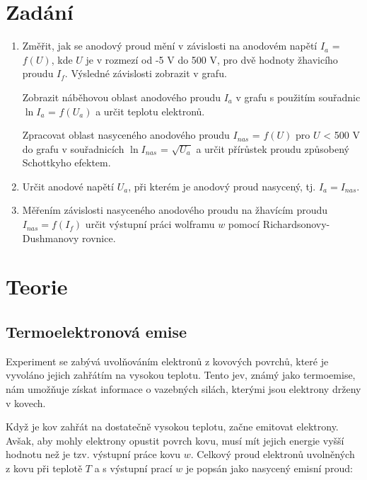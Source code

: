 \documentclass[a4paper,11pt]{article}
\begin{document}
\vskip10pt
    \begin{minipage}[t]{0.5\textwidth} 
        \section{Zadání}    
            \begin{enumerate}
                \item Změřit, jak se anodový proud mění v závislosti na anodovém napětí $I_a$ = $f(U)$, kde $U$ je v rozmezí od -5 V do 500 V, pro dvě hodnoty žhavicího proudu $I_f$. Výsledné závislosti zobrazit v grafu.
                \par Zobrazit náběhovou oblast anodového proudu $I_a$ v grafu s použitím souřadnic $\ln I_a$ = $f(U_a)$ a určit teplotu elektronů.
                \par Zpracovat oblast nasyceného anodového proudu $I_{nas}$ = $f(U)$ pro $U$ < 500 V do grafu v souřadnicích $\ln I_{nas}$ = $\sqrt{U_a}$ a určit přírůstek proudu způsobený Schottkyho efektem.
                
                \item Určit anodové napětí $U_a$, při kterém je anodový proud nasycený, tj. $I_a = I_{nas}$.
                
                \item Měřením závislosti nasyceného anodového proudu na žhavícím proudu $I_{nas} = f(I_f)$ určit výstupní práci wolframu $w$ pomocí Richardsonovy-Dushmanovy rovnice.
            \end{enumerate}
        \section{Teorie}
            \subsection{Termoelektronová emise}
                Experiment se zabývá uvolňováním elektronů z kovových povrchů, které je vyvoláno jejich zahřátím na vysokou teplotu. Tento jev, známý jako termoemise, nám umožňuje získat informace o vazebných silách, kterými jsou elektrony drženy v kovech.
                \par Když je kov zahřát na dostatečně vysokou teplotu, začne emitovat elektrony. Avšak, aby mohly elektrony opustit povrch kovu, musí mít jejich energie vyšší hodnotu než je tzv. výstupní práce kovu $w$. Celkový proud elektronů uvolněných z kovu při teplotě $T$ a s výstupní prací $w$ je popsán jako nasycený emisní proud:
    \end{minipage}
\end{document}
